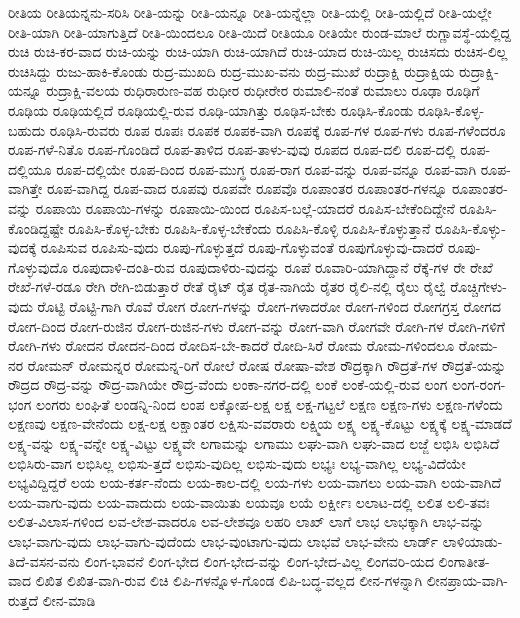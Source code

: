 {ರೀತಿಯ
ರೀತಿಯನ್ನನು-ಸರಿಸಿ
ರೀತಿ-ಯನ್ನು
ರೀತಿ-ಯನ್ನೂ
ರೀತಿ-ಯನ್ನೆಲ್ಲಾ
ರೀತಿ-ಯಲ್ಲಿ
ರೀತಿ-ಯಲ್ಲಿದೆ
ರೀತಿ-ಯಲ್ಲೇ
ರೀತಿ-ಯಾಗಿ
ರೀತಿ-ಯಾಗುತ್ತಿದೆ
ರೀತಿ-ಯಿಂದಲೂ
ರೀತಿ-ಯಿದೆ
ರೀತಿಯೂ
ರೀತಿಯೇ
ರುಂಡ-ಮಾಲೆ
ರುಗ್ಣಾವಸ್ಥೆ-ಯಲ್ಲಿದ್ದ
ರುಚಿ
ರುಚಿ-ಕರ-ವಾದ
ರುಚಿ-ಯನ್ನು
ರುಚಿ-ಯಾಗಿ
ರುಚಿ-ಯಾಗಿದೆ
ರುಚಿ-ಯಾದ
ರುಚಿ-ಯಿಲ್ಲ
ರುಚಿಸದು
ರುಚಿಸ-ಲಿಲ್ಲ
ರುಚಿಸಿದ್ದು
ರುಜು-ಹಾಕಿ-ಕೊಂಡು
ರುದ್ರ-ಮುಖದಿ
ರುದ್ರ-ಮುಖ-ವನು
ರುದ್ರ-ಮುಖೆ
ರುದ್ರಾಕ್ಷಿ
ರುದ್ರಾಕ್ಷಿಯ
ರುದ್ರಾಕ್ಷಿ-ಯನ್ನೂ
ರುದ್ರಾಕ್ಷಿ-ವಲಯ
ರುಧಿರಾರುಣ-ವಹ
ರುಧೀರ
ರುಧೀರೇರ
ರುಮಾಲಿ-ನಂತೆ
ರುಮಾಲು
ರೂಢಾ
ರೂಢಿಗೆ
ರೂಢಿಯ
ರೂಢಿಯಲ್ಲಿದೆ
ರೂಢಿಯಲ್ಲಿ-ರುವ
ರೂಢಿ-ಯಾಗಿತ್ತು
ರೂಢಿಸ-ಬೇಕು
ರೂಢಿಸಿ-ಕೊಂಡು
ರೂಢಿಸಿ-ಕೊಳ್ಳ-ಬಹುದು
ರೂಢಿಸಿ-ರುವರು
ರೂಪ
ರೂಪಃ
ರೂಪಕ
ರೂಪಕ-ವಾಗಿ
ರೂಪಕ್ಕೆ
ರೂಪ-ಗಳ
ರೂಪ-ಗಳು
ರೂಪ-ಗಳೆಂದರೂ
ರೂಪ-ಗಳೆ-ನಿತೊ
ರೂಪ-ಗೊಂಡಿದೆ
ರೂಪ-ತಾಳಿದ
ರೂಪ-ತಾಳು-ವುವು
ರೂಪದ
ರೂಪ-ದಲಿ
ರೂಪ-ದಲ್ಲಿ
ರೂಪ-ದಲ್ಲಿಯೂ
ರೂಪ-ದಲ್ಲಿಯೇ
ರೂಪ-ದಿಂದ
ರೂಪ-ಮುಗ್ಧ
ರೂಪ-ರಾಗ
ರೂಪ-ವನ್ನು
ರೂಪ-ವನ್ನೂ
ರೂಪ-ವಾಗಿ
ರೂಪ-ವಾಗಿತ್ತೇ
ರೂಪ-ವಾಗಿದ್ದ
ರೂಪ-ವಾದ
ರೂಪವು
ರೂಪವೇ
ರೂಪವೊ
ರೂಪಾಂತರ
ರೂಪಾಂತರ-ಗಳನ್ನೂ
ರೂಪಾಂತರ-ವನ್ನು
ರೂಪಾಯಿ
ರೂಪಾಯಿ-ಗಳನ್ನು
ರೂಪಾಯಿ-ಯಿಂದ
ರೂಪಿಸ-ಬಲ್ಲೆ-ಯಾದರೆ
ರೂಪಿಸ-ಬೇಕೆಂದಿದ್ದೇನೆ
ರೂಪಿಸಿ-ಕೊಂಡಿದ್ದಷ್ಟೇ
ರೂಪಿಸಿ-ಕೊಳ್ಳ-ಬೇಕು
ರೂಪಿಸಿ-ಕೊಳ್ಳ-ಬೇಕೆಂದು
ರೂಪಿಸಿ-ಕೊಳ್ಳಿ
ರೂಪಿಸಿ-ಕೊಳ್ಳುತ್ತಾನೆ
ರೂಪಿಸಿ-ಕೊಳ್ಳು-ವುದಕ್ಕೆ
ರೂಪಿಸುವ
ರೂಪಿಸು-ವುದು
ರೂಪು-ಗೊಳ್ಳುತ್ತದೆ
ರೂಪು-ಗೊಳ್ಳುವಂತೆ
ರೂಪುಗೊಳ್ಳುವು-ದಾದರೆ
ರೂಪು-ಗೊಳ್ಳುವುದೊ
ರೂಪುದಾಳಿ-ದಂತಿ-ರುವ
ರೂಪುದಾಳಿರು-ವುದನ್ನು
ರೂಪೆ
ರೂವಾರಿ-ಯಾಗಿದ್ದಾನೆ
ರೆಕ್ಕೆ-ಗಳ
ರೇ
ರೇಖೆ
ರೇಖೆ-ಗಳೆ-ರಡೂ
ರೇಗಿ
ರೇಗಿ-ಬಿಡುತ್ತಾರೆ
ರೇತೆ
ರೈಟ್
ರೈತ
ರೈತ-ನಾಗಿಯೆ
ರೈತರ
ರೈಲಿ-ನಲ್ಲಿ
ರೈಲು
ರೈಲ್ವೆ
ರೊಚ್ಚಿಗೇಳು-ವುದು
ರೊಟ್ಟಿ
ರೊಟ್ಟಿ-ಗಾಗಿ
ರೊವೆ
ರೋಗ
ರೋಗ-ಗಳನ್ನು
ರೋಗ-ಗಳಾದರೋ
ರೋಗ-ಗಳಿಂದ
ರೋಗಗ್ರಸ್ತ
ರೋಗದ
ರೋಗ-ದಿಂದ
ರೋಗ-ರುಜಿನ
ರೋಗ-ರುಜಿನ-ಗಳು
ರೋಗ-ವನ್ನು
ರೋಗ-ವಾಗಿ
ರೋಗವೇ
ರೋಗಿ-ಗಳ
ರೋಗಿ-ಗಳಿಗೆ
ರೋಗಿ-ಗಳು
ರೋದನ
ರೋದನ-ದಿಂದ
ರೋದಿಸ-ಬೇ-ಕಾದರೆ
ರೋದಿ-ಸಿರೆ
ರೋಮ
ರೋಮ-ಗಳಿಂದಲೂ
ರೋಮ-ನರ
ರೋಮನ್
ರೋಮನ್ನರ
ರೋಮನ್ನ-ರಿಗೆ
ರೋಲೆ
ರೋಷ
ರೋಷಾ-ವೇಶ
ರೌದ್ರಕ್ಕಾಗಿ
ರೌದ್ರತೆ-ಗಳ
ರೌದ್ರತೆ-ಯನ್ನು
ರೌದ್ರದ
ರೌದ್ರ-ವನ್ನು
ರೌದ್ರ-ವಾಗಿಯೇ
ರೌದ್ರ-ವೆಂದು
ಲಂಕಾ-ನಗರ-ದಲ್ಲಿ
ಲಂಕೆ
ಲಂಕೆ-ಯಲ್ಲಿ-ರುವ
ಲಂಗ
ಲಂಗ-ರಂಗ-ಭಂಗ
ಲಂಗರು
ಲಂಘಿತೆ
ಲಂಡನ್ನಿ-ನಿಂದ
ಲಂಪ
ಲಕ್ಕೋಪ-ಲಕ್ಷ
ಲಕ್ಷ
ಲಕ್ಷ-ಗಟ್ಟಲೆ
ಲಕ್ಷಣ
ಲಕ್ಷಣ-ಗಳು
ಲಕ್ಷಣ-ಗಳೆಂದು
ಲಕ್ಷಣವು
ಲಕ್ಷಣ-ವೇನೆಂದು
ಲಕ್ಷ-ಲಕ್ಷ
ಲಕ್ಷಾಂತರ
ಲಕ್ಷಿಸು-ವವರಾರು
ಲಕ್ಷ್ಮಿಯ
ಲಕ್ಷ್ಯ
ಲಕ್ಷ್ಯ-ಕೊಟ್ಟು
ಲಕ್ಷ್ಯಕ್ಕೆ
ಲಕ್ಷ್ಯ-ಮಾಡದೆ
ಲಕ್ಷ್ಯ-ವನ್ನು
ಲಕ್ಷ್ಯ-ವನ್ನೇ
ಲಕ್ಷ್ಯ-ವಿಟ್ಟು
ಲಕ್ಷ್ಯವೇ
ಲಗಾಮನ್ನು
ಲಗಾಮು
ಲಘು-ವಾಗಿ
ಲಘು-ವಾದ
ಲಜ್ಜೆ
ಲಭಿಸಿ
ಲಭಿಸಿದೆ
ಲಭಿಸಿರು-ವಾಗ
ಲಭಿಸಿಲ್ಲ
ಲಭಿಸು-ತ್ತದೆ
ಲಭಿಸು-ವುದಿಲ್ಲ
ಲಭಿಸು-ವುದು
ಲಭ್ಯಃ
ಲಭ್ಯ-ವಾಗಿಲ್ಲ
ಲಭ್ಯ-ವಿದೆಯೇ
ಲಭ್ಯವಿದ್ದಿದ್ದರೆ
ಲಯ
ಲಯ-ಕರ್ತ-ನೆಂದು
ಲಯ-ಕಾಲ-ದಲ್ಲಿ
ಲಯ-ಗಳು
ಲಯ-ವಾಗಲು
ಲಯ-ವಾಗಿ
ಲಯ-ವಾಗಿದೆ
ಲಯ-ವಾಗು-ವುದು
ಲಯ-ವಾದುದು
ಲಯ-ವಾಯಿತು
ಲಯವೂ
ಲಯೆ
ಲರ್ಕ್ಷೀಃ
ಲಲಾಟ-ದಲ್ಲಿ
ಲಲಿತ
ಲಲಿ-ತವಃ
ಲಲಿತ-ವಿಲಾಸ-ಗಳಿಂದ
ಲವ-ಲೇಶ-ವಾದರೂ
ಲವ-ಲೇಶವೂ
ಲಹರಿ
ಲಾಖ್
ಲಾಗೆ
ಲಾಭ
ಲಾಭಕ್ಕಾಗಿ
ಲಾಭ-ವನ್ನು
ಲಾಭ-ವಾಗು-ವುದು
ಲಾಭ-ವಾಗು-ವುದೆಂದು
ಲಾಭ-ವುಂಟಾಗು-ವುದು
ಲಾಭವೆ
ಲಾಭ-ವೇನು
ಲಾರ್ಡ್
ಲಾಳಿಯಾಡು-ತಿದೆ-ವಸನ-ವನು
ಲಿಂಗ-ಭಾವನೆ
ಲಿಂಗ-ಭೇದ
ಲಿಂಗ-ಭೇದ-ವನ್ನು
ಲಿಂಗ-ಭೇದ-ವಿಲ್ಲ
ಲಿಂಗವರಿ-ಯದ
ಲಿಂಗಾತೀತ-ವಾದ
ಲಿಖಿತ
ಲಿಖಿತ-ವಾಗಿ-ರುವ
ಲಿಚಿ
ಲಿಪಿ-ಗಳನ್ನೊಳ-ಗೊಂಡ
ಲಿಪಿ-ಬದ್ಧ-ವಲ್ಲದ
ಲೀನ-ಗಳನ್ನಾಗಿ
ಲೀನಪ್ರಾಯ-ವಾಗಿ-ರುತ್ತದೆ
ಲೀನ-ಮಾಡಿ
}
